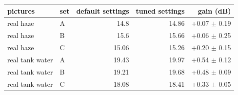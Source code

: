 \begin{tabular}{llrrr}
\toprule
pictures & set & default settings & tuned settings & gain (dB) \\
\midrule
real haze & A & 14.8 & 14.86 & +0.07 $\pm$ 0.19 \\
real haze & B & 15.6 & 15.66 & +0.06 $\pm$ 0.25 \\
real haze & C & 15.06 & 15.26 & +0.20 $\pm$ 0.15 \\
real tank water & A & 19.43 & 19.97 & +0.54 $\pm$ 0.12 \\
real tank water & B & 19.21 & 19.68 & +0.48 $\pm$ 0.09 \\
real tank water & C & 18.08 & 18.41 & +0.33 $\pm$ 0.05 \\
\bottomrule
\end{tabular}
